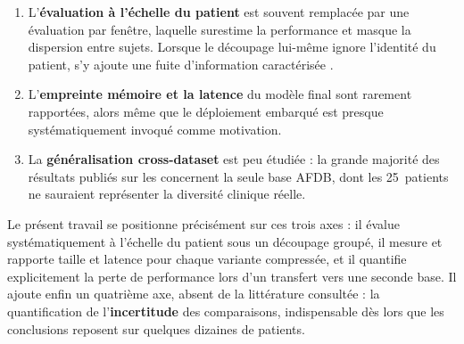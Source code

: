 \begin{enumerate}[leftmargin=*]
  \item L'\textbf{évaluation à l'échelle du patient} est souvent remplacée par une évaluation par fenêtre, laquelle surestime la performance et masque la dispersion entre sujets. Lorsque le découpage lui-même ignore l'identité du patient, s'y ajoute une fuite d'information caractérisée \cite{saeb2017need}.
  \item L'\textbf{empreinte mémoire et la latence} du modèle final sont rarement rapportées, alors même que le déploiement embarqué est presque systématiquement invoqué comme motivation.
  \item La \textbf{généralisation cross-dataset} est peu étudiée : la grande majorité des résultats publiés sur les \RR{} concernent la seule base AFDB, dont les 25~patients ne sauraient représenter la diversité clinique réelle.
\end{enumerate}

Le présent travail se positionne précisément sur ces trois axes : il évalue systématiquement à l'échelle du patient sous un découpage groupé, il mesure et rapporte taille et latence pour chaque variante compressée, et il quantifie explicitement la perte de performance lors d'un transfert vers une seconde base. Il ajoute enfin un quatrième axe, absent de la littérature consultée : la quantification de l'\textbf{incertitude} des comparaisons, indispensable dès lors que les conclusions reposent sur quelques dizaines de patients.
